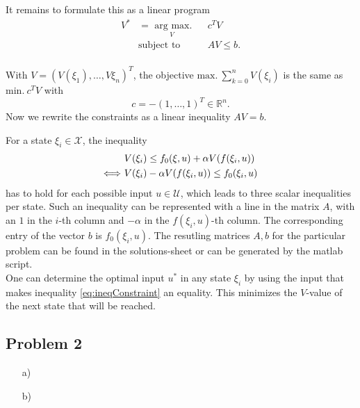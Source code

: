 \documentclass[]{article}
\newcommand{\trp}{^T}
\newcommand{\Rn}{\mathbb{R}^n}
\newcommand{\fnull}{f_0}
\newcommand{\X}{\mathcal{X}}
\newcommand{\U}{\mathcal{U}}
\newcommand{\Vopt}{\Vind{*}}
\newcommand{\Vind}[1]{V^#1}
\newcommand{\uopt}{u^*}
\begin{document}
\begin{enumerate}
			It remains to formulate this as a linear program
			\begin{equation} \label{eq:maxProblemArgmax}
				\begin{aligned}
				\Vopt &=  \underset{V}{\text{ arg max.}}
				& & c\trp V\\
				& \text{subject to}
				& & AV \leq b.\\
				\end{aligned}
			\end{equation}
			
			 With $ V = (V(\xi_1),\dots,V\xi_n)\trp $, the objective $\mathrm{max.} \ \sum_{k=0}^{n} V(\xi_i) $ is the same as $ \mathrm{min.} \ c\trp V $ with \[ c = -(1,\dots,1)\trp \in \Rn. \]
			 Now we rewrite the constraints as a linear inequality $ AV = b $.
			 
			 For a state $ \xi_i \in \X $, the inequality
			 \begin{align}
			  	&V(\xi_i) \leq \fnull (\xi,u) +  \alpha V(f(\xi_i,u))\notag\\
			 \Longleftrightarrow \ &V(\xi_i) - \alpha V(f(\xi_i,u)) \leq \fnull(\xi_i,u) \label{eq:linineq}
			 \end{align}
			has to hold for each possible input $ u \in \U $, which leads to three scalar inequalities per state. Such an inequality can be represented with a line in the matrix $ A $, with an $ 1 $ in the  $ i $-th column and $ -\alpha $ in the $ f(\xi_i,u) $-th column. The corresponding entry of the vector $ b $ is $ \fnull(\xi_i,u) $. The resutling matrices $ A,b $ for the particular problem can be found in the solutions-sheet or can be generated by the matlab script.\\
			One can determine the optimal input $ \uopt $ in any state $ \xi_i $ by using the input that makes inequality \eqref{eq:ineqConstraint} an equality. This minimizes the $ V $-value of the next state that will be reached.
		\end{enumerate} 
\subsection*{Problem 2}
		\begin{enumerate}
			\item[a)]
			\item[b)]
		\end{enumerate}	
\end{document}
